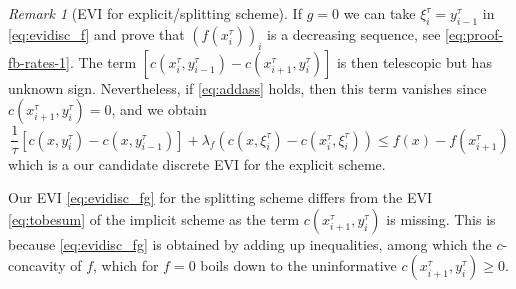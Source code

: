 \documentclass[reqno]{amsart}
\newcounter{results}[section]
\theoremstyle{plain}
\theoremstyle{remark}
\newtheorem{remark}[results]{Remark}
\theoremstyle{plain}
\numberwithin{equation}{section}
\theoremstyle{remark}
\begin{document}
\begin{remark}[EVI for explicit/splitting scheme]
    If  $g=0$  we can take $\xi_{i}^\tau=y_{i-1}^\tau$  in \eqref{eq:evidisc_f} and prove that   $(f(x_{i}^\tau))_i$ is a decreasing sequence,  see  \eqref{eq:proof-fb-rates-1}. The term $[c(x_{i}^\tau,y_{i-1}^\tau)-c(x_{i+1}^\tau,y_{i}^\tau)]$ is then telescopic but has unknown sign. Nevertheless, if  \eqref{eq:addass}  holds, then this term vanishes since $c(x_{i+1}^\tau,y_{i}^\tau)=0$, and we obtain
   \begin{equation}
       \frac{1}{\tau} [c(x,y_{i}^\tau)-c(x,y_{i-1}^\tau)]+\lambda_f (c(x,\xi_{i}^\tau)-c(x_{i}^\tau,\xi_{i}^\tau)) \leq f(x)-f(x_{i+1}^\tau)
   \end{equation}
   which is a our candidate  discrete  EVI  for  the explicit scheme. 

    Our EVI \eqref{eq:evidisc_fg} for the splitting scheme differs from the EVI \eqref{eq:tobesum} of the implicit scheme as the term $c(x_{i+1}^\tau,y_{i}^\tau)$ is missing. This is because \eqref{eq:evidisc_fg} is obtained by adding up inequalities, among which the $c$-concavity of $f$, which for $f=0$ boils down to the uninformative $c(x_{i+1}^\tau,y_{i}^\tau)\ge 0$.
\end{remark}
\end{document}
